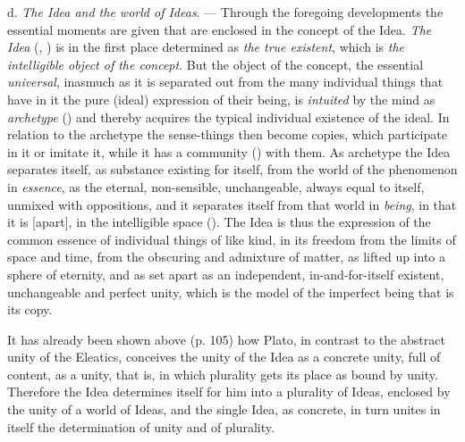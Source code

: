 \divrule

d. \emph{The Idea and the world of Ideas}. --- Through the foregoing developments the essential moments are given that
are enclosed in the concept of the Idea. \emph{The Idea} (, ) is in the first place
determined as \emph{the true existent}, which is \emph{the intelligible
object of the concept}. But the object of the concept, the
essential \emph{universal}, inasmuch as it is separated out from the many
individual things that have in it the pure (ideal) expression of their being, is \emph{intuited} by the mind as \emph{archetype} () and
thereby acquires the typical individual existence of the ideal. In relation to
the archetype the sense-things then become copies, which participate in it
or imitate it, while it has a community ()
with them. As archetype the Idea separates itself, as substance existing for itself,
from the world of the phenomenon in \emph{essence}, as the eternal,
non-sensible, unchangeable, always equal to itself, unmixed with
oppositions, and it separates itself from that world in \emph{being}, in that it is  [apart], in the intelligible space ().
The Idea is thus the expression of the common essence of individual things of like kind,
in its freedom from the limits of space and time,
from the obscuring and admixture of matter, as lifted up into a
sphere of eternity, and as set apart as an independent,
in-and-for-itself existent, unchangeable and perfect unity, which is
the model of the imperfect being that is its copy.

It has already been shown above (p. 105) how Plato,
in contrast to the abstract unity of the Eleatics, conceives the unity of the Idea
as a concrete unity, full of content, as a unity,
that is, in which plurality gets its place as bound by
unity. Therefore the Idea determines itself for him into a plurality
of Ideas, enclosed by the unity of a world of Ideas, and the single
Idea, as concrete, in turn unites in itself the determination of unity and of plurality.

